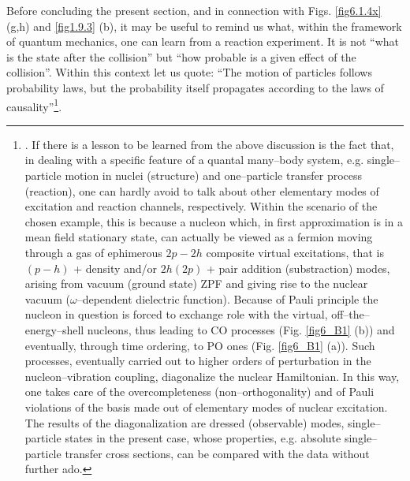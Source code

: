  Before concluding the present section, and in connection with Figs. \ref{fig6.1.4x} (g,h) and \ref{fig1.9.3} (b), it may be useful to remind us what, within the framework of quantum mechanics, one can learn from a reaction experiment. It is not ``what is the state after the collision'' but ``how probable is a given effect of the collision''. Within this context let us quote: ``The motion of particles follows probability laws, but the probability itself propagates according to the laws of causality''\footnote{\cite{Born:26}. If there is a lesson to be learned from the above discussion is the fact that, in dealing with a specific feature of a quantal many--body system, e.g. single--particle motion in nuclei (structure) and one--particle transfer process (reaction), one can hardly avoid to talk about other elementary modes of excitation and  reaction channels, respectively. Within the scenario of the chosen example, this is because a nucleon which, in first approximation is in a mean field stationary state, can actually be viewed as a fermion moving through a gas of ephimerous $2p-2h$ composite virtual excitations, that is $(p-h)$ + density and/or $2h(2p)$ + pair addition (substraction) modes, arising from vacuum (ground state) ZPF and giving rise to the nuclear vacuum ($\omega$--dependent dielectric function). Because of Pauli principle \citep{Pauli:47} the nucleon in question is forced to exchange role with the virtual, off--the--energy--shell nucleons, thus leading to CO processes (Fig. \ref{fig6_B1} (b)) and eventually, through time ordering, to PO ones (Fig. \ref{fig6_B1} (a)). Such processes, eventually carried out to higher orders of perturbation in the nucleon--vibration coupling, diagonalize the nuclear Hamiltonian. In this way, one takes care of the overcompleteness (non--orthogonality) and of Pauli violations of the basis made out of elementary modes of nuclear excitation. The results of the diagonalization  are dressed (observable) modes, single--particle states in the present case, whose properties, e.g. absolute single--particle transfer cross sections, can be compared with the data without further ado.}.





